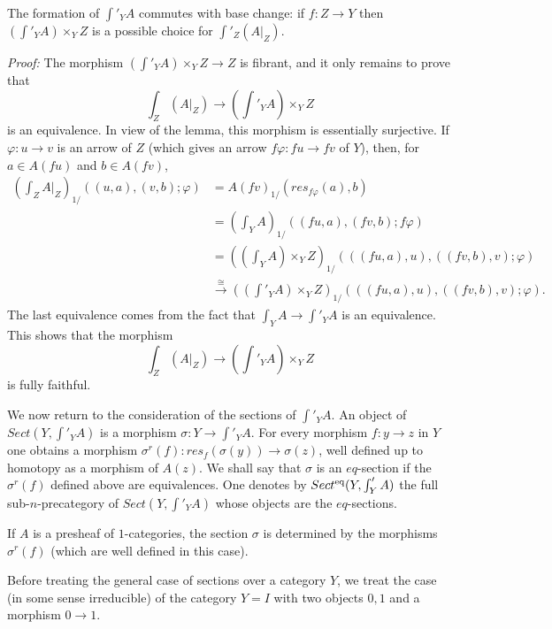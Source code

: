 \begin{corollary}
The formation of $\int '_YA$ commutes with base change: if $f:Z\rightarrow Y$
then $(\int '_YA)\times _YZ$ is a possible choice for $\int '_Z(A|_Z)$.
\end{corollary}
{\em Proof:}
The morphism $(\int '_YA)\times _YZ\rightarrow Z$ is fibrant, and it only
remains
to prove that
$$
\int _Z(A|_Z)\rightarrow  (\int '_YA)\times _YZ
$$
is an equivalence. In view of the lemma, this morphism is essentially
surjective.
If $\varphi : u\rightarrow v$ is an arrow of $Z$ (which gives an arrow
$f\varphi : fu\rightarrow fv$ of $Y$), then, for $a\in A(fu)$ and $b\in A(fv)$,
\begin{align*}
(\int _ZA|_Z)_{1/}((u,a), (v,b); \varphi ) &= A(fv)_{1/}(res_{f\varphi}(a),
b)\\
&= (\int _YA)_{1/}((fu,a), (fv,b); f\varphi ) \\
& = ((\int _YA)\times _YZ)_{1/}(((fu,a), u), ((fv,b), v); \varphi )\\
& \stackrel{\cong}{\rightarrow}
((\int' _YA)\times _YZ)_{1/}(((fu,a), u), ((fv,b), v); \varphi ).
\end{align*}
The last equivalence
comes from the fact that $\int _YA\rightarrow \int '_YA$ is an
equivalence. This shows that the morphism
$$
\int _Z(A|_Z)\rightarrow  (\int '_YA)\times _YZ
$$
is fully faithful.
\eop


We now return to the consideration of the sections of $\int '_YA$.
An object of \linebreak
$Sect(Y,\int '_YA)$ is a morphism $\sigma : Y\rightarrow
\int '_YA$. For every morphism $f:y\rightarrow z$ in $Y$ one obtains a
morphism $\sigma ^r(f): res_f(\sigma (y))\rightarrow \sigma (z)$, well defined
up to homotopy as a morphism of $A(z)$. We shall say that $\sigma$ is an
$eq$-section if the $\sigma ^r(f)$ defined above are equivalences.
One denotes by $Sect^{\rm eq}(Y,\int '_YA)$ the full sub-$n$-precategory of
$Sect(Y,\int '_YA)$ whose objects are the
$eq$-sections.

If $A$ is a presheaf of $1$-categories, the section $\sigma$
is determined by the morphisms $\sigma ^r(f)$ (which are well defined
in this case).

Before treating the general case of sections over a category
$Y$, we treat the case (in some sense irreducible) of the category $Y=I$
with two objects $0,1$ and a morphism $0\rightarrow 1$.


